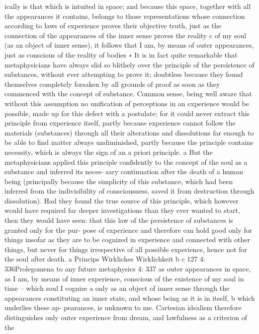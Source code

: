 ically is that which is intuited in space; and because this space, together
with all the appearances it contains, belongs to those representations
whose connection according to laws of experience proves their objective
truth, just as the connection of the appearances of the inner sense proves
the reality c of my soul (as an object of inner sense), it follows that I am,
by means of outer appearances, just as conscious of the reality of bodies
∗ It is in fact quite remarkable that metaphysicians have always slid so blithely
over the principle of the persistence of substances, without ever attempting to
prove it; doubtless because they found themselves completely forsaken by all
grounds of proof as soon as they commenced with the concept of substance.
Common sense, being well aware that without this assumption no uniﬁcation
of perceptions in an experience would be possible, made up for this defect
with a postulate; for it could never extract this principle from experience itself,
partly because experience cannot follow the materials (substances) through all
their alterations and dissolutions far enough to be able to ﬁnd matter always
undiminished, partly because the principle contains necessity, which is always
the sign of an a priori principle. a But the metaphysicians applied this principle
conﬁdently to the concept of the soul as a substance and inferred its neces-
sary continuation after the death of a human being (principally because the
simplicity of this substance, which had been inferred from the indivisibility
of consciousness, saved it from destruction through dissolution). Had they
found the true source of this principle, which however would have required
far deeper investigations than they ever wanted to start, then they would have
seen: that this law of the persistence of substances is granted only for the pur-
pose of experience and therefore can hold good only for things insofar as they
are to be cognized in experience and connected with other things, but never
for things irrespective of all possible experience, hence not for the soul after
death.
a Princips
Wirkliches
Wirklichkeit
b
c
127
4: 336Prolegomena to any future metaphysics
4: 337
as outer appearances in space, as I am, by means of inner experience,
conscious of the existence of my soul in time – which soul I cognize a
only as an object of inner sense through the appearances constituting an
inner state, and whose being as it is in itself, b which underlies these ap-
pearances, is unknown to me. Cartesian idealism therefore distinguishes
only outer experience from dream, and lawfulness as a criterion of the
